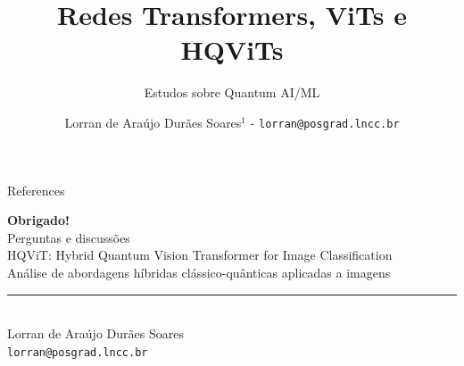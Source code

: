 \documentclass[9pt]{beamer}
\title{Redes Transformers, ViTs e HQViTs\\}
\subtitle{Estudos sobre Quantum AI/ML}
\author{
    \begin{tabular}{l}
        \\
        Lorran de Araújo Durães Soares$^{1}$ - \texttt{lorran@posgrad.lncc.br} \\
    \end{tabular}
}
\institute[]{\normalsize
  \inst{1} Laboratório Nacional de Computação Científica (LNCC/MCTI)\\ 
}
\begin{document}
\maketitle



\begin{frame}[allowframebreaks]{References}
    
\end{frame}

\begin{frame}[plain]
    \vfill
    \begin{center}
        {\color{LNCCaltblue}\Huge\bfseries Obrigado!}\\[0.4cm]
        {\Large Perguntas e discussões}\\[0.8cm]
        {\normalsize
        HQViT: Hybrid Quantum Vision Transformer for Image Classification\\[0.15cm]
        Análise de abordagens híbridas clássico-quânticas aplicadas a imagens
        }

        \vspace{0.3cm}
        {\color{LNCCaltblue}\rule{0.62\linewidth}{0.8pt}}\\[0.35cm]
        {\small Lorran de Araújo Durães Soares\\
        \texttt{lorran@posgrad.lncc.br}}
    \end{center}
    \vfill
\end{frame}
\end{document}

